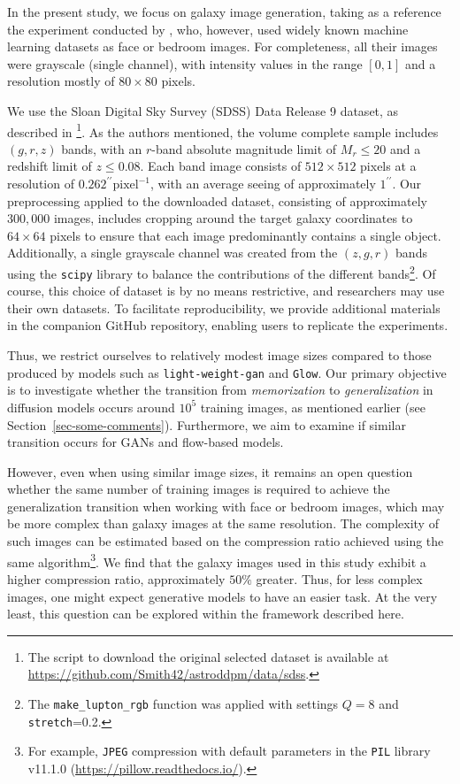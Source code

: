 \documentclass[fleqn,usenatbib]{mnras}
\begin{document}
{\color{red}
In the present study, we focus on galaxy image generation, taking as a reference the experiment conducted by \cite{kadkhodaie2024generalization}, who, however, used widely known machine learning datasets as face or bedroom images. For completeness, all their images were grayscale (single channel), with intensity values in the range $[0,1]$ and a resolution mostly of $80 \times 80$ pixels.

We use the Sloan Digital Sky Survey (SDSS) Data Release 9 dataset, as described in \citep{smith2021}\footnote{The script to download the original selected dataset is available at \url{https://github.com/Smith42/astroddpm/data/sdss}.}. As the authors mentioned, the volume complete sample includes $(g,r,z)$ bands, with an $r$-band absolute magnitude limit of $M_r\leq 20$ and a redshift limit of $z\leq 0.08$. Each band image consists of $512\times 512$ pixels at a resolution of $0.262^{\prime\prime} \mathrm{pixel}^{-1}$, with an average seeing of approximately $1^{\prime\prime}$. Our preprocessing applied to the downloaded dataset, consisting of approximately $300,000$ images, includes cropping around the target galaxy coordinates to $64 \times 64$ pixels to ensure that each image predominantly contains a single object. Additionally, a single grayscale channel was created from the $(z, g, r)$ bands using the \texttt{scipy} \citep{2020SciPy-NMeth} library to balance the contributions of the different bands\footnote{The \texttt{make\_lupton\_rgb} function was applied with settings $Q=8$ and \texttt{stretch}=0.2.}. Of course, this choice of dataset is by no means restrictive, and researchers may use their own datasets. To facilitate reproducibility, we provide additional materials in the companion GitHub repository, enabling users to replicate the experiments.

Thus, we restrict ourselves to relatively modest image sizes compared to those produced by models such as \texttt{light-weight-gan} and \texttt{Glow}. Our primary objective is to investigate whether the transition from \textit{memorization} to \textit{generalization} in diffusion models occurs around $10^5$ training images, as mentioned earlier (see Section~\ref{sec-some-comments}). Furthermore, we aim to examine if similar transition occurs for  GANs and flow-based models. 

However, even when using similar image sizes, it remains an open question whether the same number of training images is required to achieve the generalization transition when working with face or bedroom images, which may be more complex than galaxy images at the same resolution. The complexity of such images can be estimated based on the compression ratio achieved using the same algorithm\footnote{For example, \texttt{JPEG} compression with default parameters in the \texttt{PIL} library v11.1.0 (\url{https://pillow.readthedocs.io/}).}. We find that the galaxy images used in this study exhibit a higher compression ratio, approximately $50\%$ greater. Thus, for less complex images, one might expect generative models to have an easier task. At the very least, this question can be explored within the framework described here.
}
\end{document}
